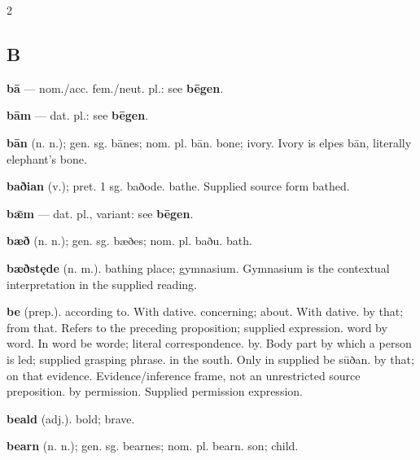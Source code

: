 \begin{multicols*}{2}
\subsection*{B}
\textbf{bā} — nom./acc. fem./neut. pl.: see \textbf{bēgen}.\par
\textbf{bām} — dat. pl.: see \textbf{bēgen}.\par
\textbf{bān} (n. n.); gen. sg. bānes; nom. pl. bān. bone; ivory. Ivory is elpes bān, literally elephant's bone.\par
\textbf{baðian} (v.); pret. 1 sg. baðode. bathe. Supplied source form bathed.\par
\textbf{bǣm} — dat. pl., variant: see \textbf{bēgen}.\par
\textbf{bæð} (n. n.); gen. sg. bæðes; nom. pl. baðu. bath.\par
\textbf{bæðstęde} (n. m.). bathing place; gymnasium. Gymnasium is the contextual interpretation in the supplied reading.\par
\textbf{be} (prep.). according to. With dative. concerning; about. With dative. by that; from that. Refers to the preceding proposition; supplied expression. word by word. In word be worde; literal correspondence. by. Body part by which a person is led; supplied grasping phrase. in the south. Only in supplied be sūðan. by that; on that evidence. Evidence/inference frame, not an unrestricted source preposition. by permission. Supplied permission expression.\par
\textbf{beald} (adj.). bold; brave.\par
\textbf{bearn} (n. n.); gen. sg. bearnes; nom. pl. bearn. son; child.\par

\end{multicols*}
